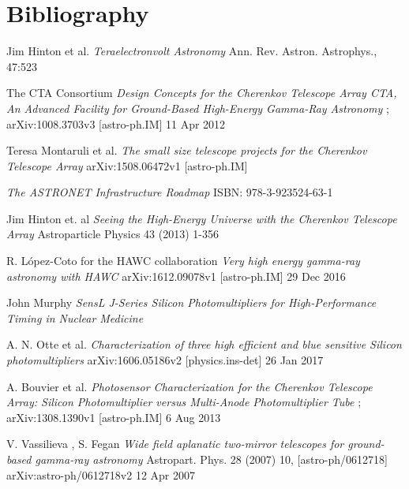\documentclass[12pt,article,type=msc,colorback,accentcolor=tud9c]{tudthesis}
\begin{document}
\newpage
\section{\Large Bibliography}
\begin{thebibliography}{12}

 Jim Hinton et al. \textit{Teraelectronvolt Astronomy} Ann. Rev. Astron. Astrophys., 47:523



 The CTA Consortium \textit{Design Concepts for the Cherenkov Telescope Array CTA, An Advanced Facility for Ground-Based High-Energy Gamma-Ray Astronomy} ; arXiv:1008.3703v3 [astro-ph.IM] 11 Apr 2012

 Teresa Montaruli et al. \textit{The small size telescope projects for the Cherenkov Telescope Array} arXiv:1508.06472v1 [astro-ph.IM]

 \textit{The ASTRONET Infrastructure Roadmap} ISBN: 978-3-923524-63-1

 Jim Hinton et. al \textit{Seeing the High-Energy Universe with the Cherenkov Telescope Array} Astroparticle Physics 43 (2013) 1-356 

 R. L\'opez-Coto for the HAWC collaboration \textit{Very high energy gamma-ray astronomy with HAWC} arXiv:1612.09078v1 [astro-ph.IM] 29 Dec 2016

 John Murphy \textit{SensL J-Series Silicon Photomultipliers for High-Performance Timing in Nuclear Medicine}

 A. N. Otte et al. \textit{Characterization of three high efficient and blue sensitive Silicon photomultipliers} arXiv:1606.05186v2 [physics.ins-det] 26 Jan 2017

  A. Bouvier et al. \textit{Photosensor Characterization for the Cherenkov Telescope Array: Silicon Photomultiplier versus Multi-Anode Photomultiplier Tube} ; arXiv:1308.1390v1 [astro-ph.IM] 6 Aug 2013

 V. Vassilieva , S. Fegan \textit{Wide field aplanatic two-mirror telescopes for ground-based gamma-ray astronomy} Astropart. Phys. 28 (2007) 10, [astro-ph/0612718] arXiv:astro-ph/0612718v2 12 Apr 2007


\end{thebibliography}
\end{document}

